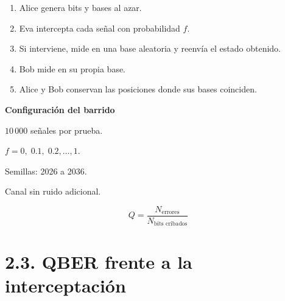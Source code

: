 \documentclass{afitdefense}
\begin{document}
\begin{Center}

\begin{minipage}[c]{0.55\textwidth}
\small

\begin{enumerate}
    \item Alice genera bits y bases al azar.
    \item Eva intercepta cada señal
    con probabilidad $f$.
    \item Si interviene, mide en una base
    aleatoria y reenvía el estado obtenido.
    \item Bob mide en su propia base.
    \item Alice y Bob conservan las posiciones
    donde sus bases coinciden.
\end{enumerate}

\end{minipage}
\hfill
\begin{minipage}[c]{0.41\textwidth}
\small
\centering

\textbf{Configuración del barrido}

\medskip

$10\,000$ señales por prueba.

\medskip

$f=0,\;0.1,\;0.2,\ldots,1$.

\medskip

Semillas: 2026 a 2036.

\medskip

Canal sin ruido adicional.

\[
Q=\frac{N_{\text{errores}}}
{N_{\text{bits cribados}}}
\]

\end{minipage}

\medskip



\end{Center}

\section{2.3. QBER frente a la interceptación}
\end{document}
